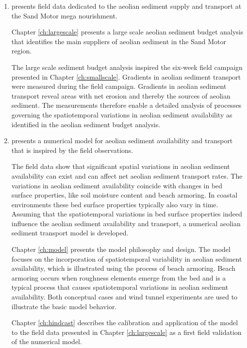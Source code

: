 \begin{enumerate}[{Part} I]
\item presents field data dedicated to the aeolian sediment supply and
  transport at the Sand Motor mega nourishment.

  Chapter \ref{ch:largescale} presents a large scale aeolian sediment
  budget analysis that identifies the main suppliers of aeolian
  sediment in the Sand Motor region.

  The large scale sediment budget analysis inspired the six-week field
  campaign presented in Chapter \ref{ch:smallscale}. Gradients in
  aeolian sediment transport were measured during the field
  campaign. Gradients in aeolian sediment transport reveal areas with
  net erosion and thereby the sources of aeolian sediment. The
  measurements therefore enable a detailed analysis of processes
  governing the spatiotemporal variations in aeolian sediment
  availability as identified in the aeolian sediment budget analysis.

\item presents a numerical model for aeolian sediment
  availability and transport that is inspired by the field
  observations.

  The field data show that significant spatial variations in aeolian
  sediment availability can exist and can affect net aeolian sediment
  transport rates. The variations in aeolian sediment availability
  coincide with changes in bed surface properties, like soil moisture
  content and beach armoring. In coastal environments these bed
  surface properties typically also vary in time. Assuming that the
  spatiotemporal variations in bed surface properties indeed influence
  the aeolian sediment availability and transport, a numerical aeolian
  sediment transport model is developed.

  Chapter \ref{ch:model} presents the model philosophy and design. The
  model focuses on the incorporation of spatiotemporal variability in
  aeolian sediment availability, which is illustrated using the
  process of beach armoring. Beach armoring occurs when roughness
  elements emerge from the bed and is a typical process that causes
  spatiotemporal variations in aeolian sediment availability. Both
  conceptual cases and wind tunnel experiments are used to illustrate
  the basic model behavior.

  Chapter \ref{ch:hindcast} describes the calibration and application
  of the model to the field data presented in Chapter
  \ref{ch:largescale} as a first field validation of the
  numerical model.


\end{enumerate}
